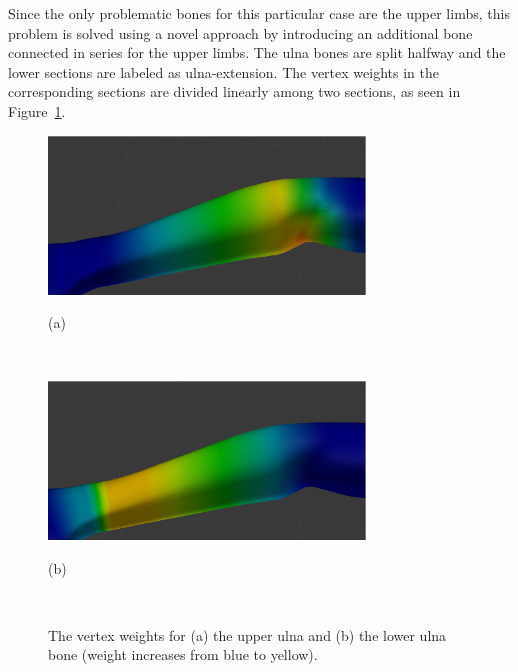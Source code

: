 Since the only problematic bones for this particular case are the upper limbs, this problem is solved using a novel approach by introducing an additional bone connected in series for the upper limbs. The ulna bones are split halfway and the lower sections are labeled as ulna-extension. The vertex weights in the corresponding sections are divided linearly among two sections, as seen in Figure~\ref{fig:forearm-weights}. 


\begin{figure}[htbp]
	\centerline{\includegraphics[width=0.75\textwidth]{./figures/ulna-weight.eps}}
	\centerline{(a)}
	\centerline{\ }
	\centerline{\includegraphics[width=0.75\textwidth]{./figures/ulna-extent-weight.eps}}
	\centerline{(b)} 
	\centerline{\ } 
	\caption{The vertex weights for (a) the upper ulna and (b) the lower ulna bone (weight increases from blue to yellow).}
	\label{fig:forearm-weights}
\end{figure}



